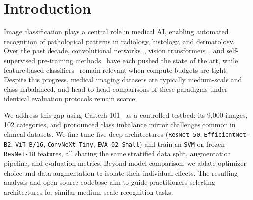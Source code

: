\section{Introduction}
\label{sec:intro}

Image classification plays a central role in medical AI, enabling automated recognition of pathological patterns in radiology, histology, and dermatology. Over the past decade, convolutional networks~\citep{he2016deep,tan2019efficientnet,liu2022convnet}, vision transformers~\citep{dosovitskiy2020image}, and self-supervised pre-training methods~\citep{fang2024eva} have each pushed the state of the art, while feature-based classifiers~\citep{donahue2014decaf} remain relevant when compute budgets are tight. Despite this progress, medical imaging datasets are typically medium-scale and class-imbalanced, and head-to-head comparisons of these paradigms under identical evaluation protocols remain scarce.

We address this gap using Caltech-101~\citep{fei2004learning} as a controlled testbed: its 9{,}000 images, 102 categories, and pronounced class imbalance mirror challenges common in clinical datasets. We fine-tune five deep architectures (\texttt{ResNet-50}, \texttt{EfficientNet-B2}, \texttt{ViT-B/16}, \texttt{ConvNeXt-Tiny}, \texttt{EVA-02-Small}) and train an \texttt{SVM} on frozen \texttt{ResNet-18} features, all sharing the same stratified data split, augmentation pipeline, and evaluation metrics. Beyond model comparison, we ablate optimizer choice and data augmentation to isolate their individual effects. The resulting analysis and open-source codebase aim to guide practitioners selecting architectures for similar medium-scale recognition tasks.
